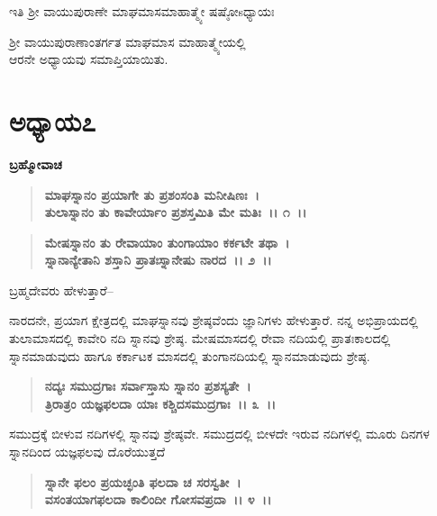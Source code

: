 \begin{center}
ಇತಿ ಶ‍್ರೀ ವಾಯುಪುರಾಣೇ ಮಾಘಮಾಸಮಾಹಾತ್ಮ್ಯೇ ಷಷ್ಠೋsಧ್ಯಾಯಃ 
\end{center}

\begin{center}
ಶ‍್ರೀ ವಾಯುಪುರಾಣಾಂತರ್ಗತ ಮಾಘಮಾಸ ಮಾಹಾತ್ಮ್ಯೇಯಲ್ಲಿ \\ ಆರನೇ ಅಧ್ಯಾಯವು ಸಮಾಪ್ತಿಯಾಯಿತು.
\end{center}

\newpage

\section*{ಅಧ್ಯಾಯ೭}

\emptypage

\begin{flushleft}
\textbf{ಬ್ರಹ್ಮೋವಾಚ }
\end{flushleft}

\begin{verse}
\textbf{ಮಾಘಸ್ನಾನಂ ಪ್ರಯಾಗೇ ತು ಪ್ರಶಂಸಂತಿ ಮನೀಷಿಣಃ~।}\\\textbf{ತುಲಾಸ್ನಾನಂ ತು ಕಾವೇರ್ಯಾಂ ಪ್ರಶಸ್ತಮಿತಿ ಮೇ ಮತಿಃ~।। ೧~।। }
\end{verse}

\begin{verse}
\textbf{ಮೇಷಸ್ನಾನಂ ತು ರೇವಾಯಾಂ ತುಂಗಾಯಾಂ ಕರ್ಕಟೇ ತಥಾ~।}\\\textbf{ಸ್ನಾನಾನ್ಯೇತಾನಿ ಶಸ್ತಾನಿ ಪ್ರಾತಃಸ್ನಾನೇಷು ನಾರದ~।। ೨~।।}
\end{verse}

\begin{flushleft}
 ಬ್ರಹ್ಮದೇವರು ಹೇಳುತ್ತಾರೆ– 
\end{flushleft}

ನಾರದನೇ, ಪ್ರಯಾಗ ಕ್ಷೇತ್ರದಲ್ಲಿ ಮಾಘಸ್ನಾನವು ಶ್ರೇಷ್ಠವೆಂದು ಜ್ಞಾನಿಗಳು ಹೇಳುತ್ತಾರೆ. ನನ್ನ ಅಭಿಪ್ರಾಯದಲ್ಲಿ ತುಲಾಮಾಸದಲ್ಲಿ ಕಾವೇರಿ ನದಿ ಸ್ನಾನವು ಶ್ರೇಷ್ಠ. ಮೇಷಮಾಸದಲ್ಲಿ ರೇವಾ ನದಿಯಲ್ಲಿ ಪ್ರಾತಃಕಾಲದಲ್ಲಿ ಸ್ನಾನಮಾಡುವುದು ಹಾಗೂ ಕರ್ಕಾಟಕ ಮಾಸದಲ್ಲಿ ತುಂಗಾನದಿಯಲ್ಲಿ ಸ್ನಾನಮಾಡುವುದು ಶ್ರೇಷ್ಠ.

\begin{verse}
\textbf{ನದ್ಯಃ ಸಮುದ್ರಗಾಃ ಸರ್ವಾಸ್ತಾಸು ಸ್ನಾನಂ ಪ್ರಶಸ್ಯತೇ~।}\\\textbf{ತ್ರಿರಾತ್ರಂ ಯಜ್ಞಫಲದಾ ಯಾಃ ಕಶ್ಚಿದಸಮುದ್ರಗಾಃ~।। ೩~।। }
\end{verse}

ಸಮುದ್ರಕ್ಕೆ ಬೀಳುವ ನದಿಗಳಲ್ಲಿ ಸ್ನಾನವು ಶ್ರೇಷ್ಠವೇ. ಸಮುದ್ರದಲ್ಲಿ ಬೀಳದೇ ಇರುವ ನದಿಗಳಲ್ಲಿ ಮೂರು ದಿನಗಳ ಸ್ನಾನದಿಂದ ಯಜ್ಞಫಲವು ದೊರೆಯುತ್ತದೆ

\begin{verse}
\textbf{ಸ್ನಾನೇ ಫಲಂ ಪ್ರಯಚ್ಛಂತಿ ಫಲದಾ ಚ ಸರಸ್ವತೀ~।}\\\textbf{ವಸಂತಯಾಗಫಲದಾ ಕಾಲಿಂದೀ ಗೋಸವಪ್ರದಾ~।। ೪~।।} 
\end{verse}


